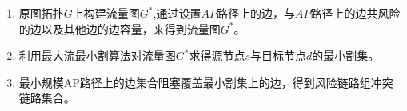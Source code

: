 \begin{enumerate}
  \item 原图拓扑$G$上构建流量图$G^*$,通过设置$AP$路径上的边，与$AP$路径上的边共风险的边以及其他边的边容量，来得到流量图$G^*$。
  \item 利用最大流最小割算法对流量图$G^*$求得源节点$s$与目标节点$d$的最小割集。
  \item 最小规模AP路径上的边集合阻塞覆盖最小割集上的边，得到风险链路组冲突链路集合。
\end{enumerate}